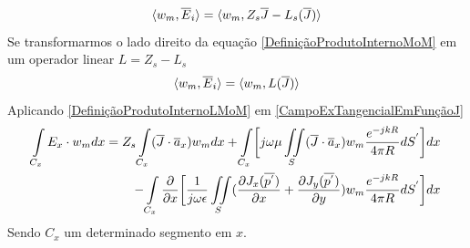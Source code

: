 \documentclass[
	12pt,				%
	openright,			%
	oneside,			%
	a4papey79r,			%
	english,			%
	brazil				%
	]{abntex2}
\begin{document}
\begin{equation}{\label{DefiniçãoProdutoInternoMoM}}
    \langle w_m,\overline{E}_i \rangle=  \langle w_m,Z_s\overline{J}-L_s(\overline{J})\rangle
\end{equation}
Se transformarmos o lado direito da equação \ref{DefiniçãoProdutoInternoMoM} em um operador linear $L=Z_s -L_s$ 
\begin{equation}{\label{DefiniçãoProdutoInternoLMoM}}
 \langle w_m,\overline{E}_i \rangle=  \langle w_m,L(\overline{J})\rangle
\end{equation}
Aplicando \ref{DefiniçãoProdutoInternoLMoM} em \ref{CampoExTangencialEmFunçãoJ}
\begin{equation}{\label{ProdutoInternoMoM}}
\begin{aligned}
 \int \limits_{C_x}E_{x} \cdot w_m dx=Z_s \int \limits_{C_x}(\overline{J}\cdot \overline{a}_x ) w_m dx
 +\int \limits_{C_x} \biggl[j\omega \mu \iint\limits_S (\overline{J}\cdot \overline{a}_x )w_m \frac{e^{-j k R}}{4 \pi R} dS^{'}  \biggl]dx\\
  -  \int\limits_{C_x}     \frac{\partial }{\partial x}\biggl[ \frac{1}{j\omega \epsilon}\iint\limits_S  (\frac{\partial J_x(\overline{p^{'}})}{\partial x}+ \frac{\partial J_y(\overline{p^{'}})}{\partial y} ) w_m \frac{e^{-j k R}}{4 \pi R} dS^{'}  \biggl] dx
\end{aligned}
\end{equation}
Sendo $C_x$ um determinado segmento em $x$.
\end{document}
